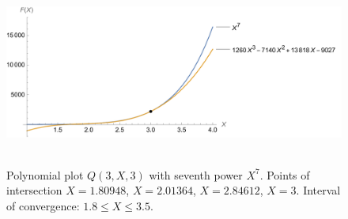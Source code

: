 ﻿\begin{figure}[H]
    \centering
    \includegraphics[width=1\textwidth]{sections/images/06_plots_polynomial_q3_n3_with_seventh}
    ~\caption{Polynomial plot $Q(3, X, 3)$ with seventh power $X^7$.
    Points of intersection $X=1.80948$, $X=2.01364$, $X=2.84612$, $X=3$.
    Interval of convergence: $1.8 \leq X \leq 3.5$.
    }\label{fig:figure12}
\end{figure}
